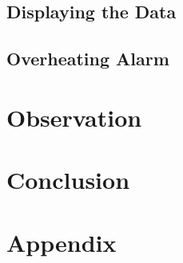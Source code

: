 \documentclass[12pt]{article}
\begin{document}
\subsection{Displaying the Data}

\subsection{Overheating Alarm}

\section{Observation}

\section{Conclusion}
\newpage

\section{Appendix}
\end{document}
